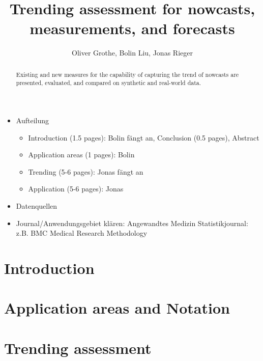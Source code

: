 \documentclass[oneside]{article}
\title{Trending assessment for nowcasts, measurements, and forecasts}
\author{Oliver Grothe, Bolin Liu, Jonas Rieger}
\theoremstyle{plain}%
\theoremstyle{definition}
\begin{document}
\maketitle

\begin{abstract}
Existing and new measures for the capability of capturing the trend of nowcasts are presented, evaluated, and compared on synthetic and real-world data.
\end{abstract}

\listoftodos


\begin{itemize}
    \item Aufteilung
    \begin{itemize}
        \item Introduction (1.5 pages): Bolin fängt an, Conclusion (0.5 pages), Abstract
        \item Application areas (1 pages): Bolin
        \item Trending (5-6 pages): Jonas fängt an
        \item Application (5-6 pages): Jonas
    \end{itemize}
    \item Datenquellen
\end{itemize}

\begin{itemize}    
    \item Journal/Anwendungsgebiet klären: Angewandtes Medizin Statistikjournal: z.B. BMC Medical Research Methodology
\end{itemize}

\section{Introduction}\label{sec:introduction}


\section{Application areas and Notation} \label{sec:notation}


\section{Trending assessment}\label{sec:trending}


%
\end{document}
